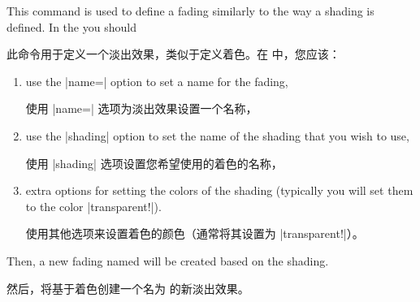 \begin{command}{\tikzfading{}}
    This command is used to define a fading similarly to the way a shading is
    defined. In the  you should
    
    此命令用于定义一个淡出效果，类似于定义着色。在  中，您应该：


    \begin{enumerate}
        \item use the |name=| option to set a name for the fading,

        使用 |name=| 选项为淡出效果设置一个名称，
        \item use the |shading| option to set the name of the shading that you
            wish to use,

            使用 |shading| 选项设置您希望使用的着色的名称，
        \item extra options for setting the colors of the shading (typically
            you will set them to the color |transparent!|).

            使用其他选项来设置着色的颜色（通常将其设置为 |transparent!|）。
    \end{enumerate}
    Then, a new fading named  will be created based on the shading.
    
    然后，将基于着色创建一个名为  的新淡出效果。
\begin{codeexample}[preamble={\usetikzlibrary{fadings,patterns}}]
\tikzfading[name=fade right,
            left color=transparent!0,
            right color=transparent!100]

\end{codeexample}

\begin{codeexample}[preamble={\usetikzlibrary{fadings,patterns}}]
\tikzfading[name=fade out,
            inner color=transparent!0,
            outer color=transparent!100]

\end{codeexample}
\end{command}


